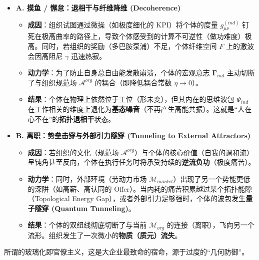 \begin{itemize}
    \item \textbf{A. 摸鱼 / 懈怠：退相干与纤维降维 (Decoherence)}
    \begin{itemize}
        \item \textbf{成因}：组织试图通过微操（如极度细化的 KPI）将个体的度量 $g_{\mu\nu}^{(ind)}$ 钉死在极高曲率的路径上，导致个体感受到的计算不可逆性（做功难度）极高。同时，若组织的奖励（多巴胺泵浦）不足，个体纤维空间 $F$ 上的激波会因高阻尼 $\gamma$ 迅速热寂。
        \item \textbf{动力学}：为了防止自身总自由能发散崩溃，个体的宏观意志 $\mathbf{\Gamma}_{ind}$ 主动切断了与组织规范场 $\mathcal{A}^{org}$ 的耦合（即降低耦合常数 $\eta \to 0$）。
        \item \textbf{结果}：个体在物理上依然位于工位（形未变），但其内在的思维波包 $\Psi_{ind}$ 在工作相关的维度上退化为\textbf{基态噪音}（不再产生高能共振）。这就是“人在心不在”的\textbf{拓扑退相干}状态。
    \end{itemize}

    \item \textbf{B. 离职：势垒击穿与外部引力隧穿 (Tunneling to External Attractors)}
    \begin{itemize}
        \item \textbf{成因}：若组织的文化（规范场 $\mathcal{A}^{org}$）与个体的核心价值（自我的调和流）呈钝角甚至反向，个体在执行任务时将承受持续的\textbf{逆流负功}（极度痛苦）。
        \item \textbf{动力学}：同时，外部环境（劳动力市场 $\mathcal{M}_{market}$）出现了另一个势能更低的深阱（如高薪、高认同的 Offer）。当内耗的痛苦积累越过某个拓扑能隙（Topological Energy Gap），或者外部引力足够强时，个体的波包发生\textbf{量子隧穿 (Quantum Tunneling)}。
        \item \textbf{结果}：个体的双纽线彻底切断了与当前 $\mathcal{M}_{org}$ 的连接（离职），飞向另一个流形。组织发生了一次微小的\textbf{物质（质元）流失}。
    \end{itemize}
\end{itemize}


所谓的玻璃化即官僚主义，这是大企业最致命的宿命，源于过度的“几何防御”。

